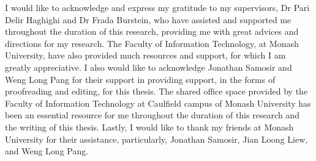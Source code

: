 
\begin{acknowledgements}      

I would like to acknowledge and express my gratitude to my supervisors, Dr Pari Delir Haghighi and Dr Frada Burstein, who have assisted and supported me throughout the duration of this research, providing me with great advices and directions for my research. The Faculty of Information Technology, at Monash University, have also provided much resources and support, for which I am greatly appreciative. I also would like to acknowledge Jonathan Samosir and Weng Long Pang for their support in providing support, in the forms of proofreading and editing, for this thesis.
The shared office space provided by the Faculty of Information Technology at Caulfield campus of Monash University has been an essential resource for me throughout the duration of this research and the writing of this thesis.
Lastly, I would like to thank my friends at Monash University for their assistance, particularly, Jonathan Samosir, Jian Loong Liew, and Weng Long Pang.

\end{acknowledgements}

